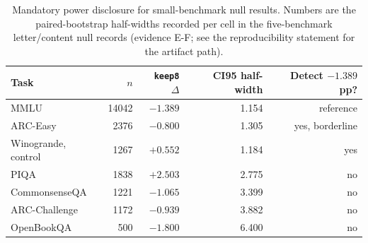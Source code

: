 \begin{table}[t]
\centering
\small
\setlength{\tabcolsep}{4.5pt}
\begin{tabular}{lrrrr}
\toprule
Task & $n$ & \texttt{keep8} $\Delta$ & CI95 half-width & Detect $-1.389$ pp? \\
\midrule
MMLU & 14042 & $-1.389$ & 1.154 & reference \\
ARC-Easy & 2376 & $-0.800$ & 1.305 & yes, borderline \\
Winogrande, control & 1267 & $+0.552$ & 1.184 & yes \\
PIQA & 1838 & $+2.503$ & 2.775 & no \\
CommonsenseQA & 1221 & $-1.065$ & 3.399 & no \\
ARC-Challenge & 1172 & $-0.939$ & 3.882 & no \\
OpenBookQA & 500 & $-1.800$ & 6.400 & no \\
\bottomrule
\end{tabular}
\caption{Mandatory power disclosure for small-benchmark null results. Numbers are the paired-bootstrap half-widths recorded per cell in the five-benchmark letter/content null records (evidence \textsf{E-F}; see the reproducibility statement for the artifact path).}
\label{tab:power}
\end{table}
